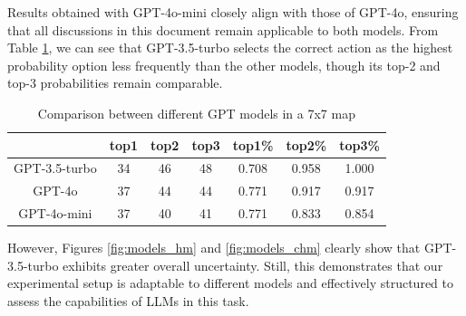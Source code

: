 Results obtained with GPT-4o-mini closely align with those of GPT-4o, ensuring
that all discussions in this document remain applicable to both models. From Table
\ref{tab:model_comparison}, we can see that GPT-3.5-turbo selects the correct
action as the highest probability option less frequently than the other models, though
its top-2 and top-3 probabilities remain comparable.

\vspace{5mm}
\begin{table}[h]
  \centering
  \begin{tabular}{c|ccc|ccc}
    \hline
                  & top1 & top2 & top3 & top1\% & top2\% & top3\% \\
    \hline
    GPT-3.5-turbo & 34   & 46   & 48   & 0.708  & 0.958  & 1.000  \\
    GPT-4o        & 37   & 44   & 44   & 0.771  & 0.917  & 0.917  \\
    GPT-4o-mini   & 37   & 40   & 41   & 0.771  & 0.833  & 0.854  \\
    \hline
  \end{tabular}
  \caption{Comparison between different GPT models in a 7x7 map}
  \label{tab:model_comparison}
\end{table}
\vspace{5mm}

However, Figures \ref{fig:models_hm} and \ref{fig:models_chm} clearly show that GPT-3.5-turbo
exhibits greater overall uncertainty. Still, this demonstrates that our experimental
setup is adaptable to different models and effectively structured to assess the capabilities
of LLMs in this task.

